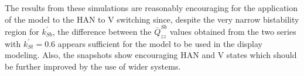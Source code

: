 The results from these simulations are reasonably encouraging for the application of the model to
the HAN to V switching since, despite the very narrow bistability region for $k^\prime_{Sb}$, 
the difference
between the $\overline{Q}^{Sb}_{zz}$ values obtained from the two series with $k^\prime_{St}=0.6$ 
appears sufficient for the model to be used in the display modeling. Also, the snapshots show 
encouraging  HAN and V states which should be further improved by the use of wider systems.









